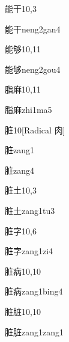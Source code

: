 \begin{entry}{能干}{10,3}
  \begin{phonetics}{能干}{neng2gan4}
  \end{phonetics}
\end{entry}

\begin{entry}{能够}{10,11}
  \begin{phonetics}{能够}{neng2gou4}
  \end{phonetics}
\end{entry}

\begin{entry}{脂麻}{10,11}
  \begin{phonetics}{脂麻}{zhi1ma5}
  \end{phonetics}
\end{entry}

\begin{entry}{脏}{10}[Radical 肉]
  \begin{phonetics}{脏}{zang1}
  \end{phonetics}
  \begin{phonetics}{脏}{zang4}
  \end{phonetics}
\end{entry}

\begin{entry}{脏土}{10,3}
  \begin{phonetics}{脏土}{zang1tu3}
  \end{phonetics}
\end{entry}

\begin{entry}{脏字}{10,6}
  \begin{phonetics}{脏字}{zang1zi4}
  \end{phonetics}
\end{entry}

\begin{entry}{脏病}{10,10}
  \begin{phonetics}{脏病}{zang1bing4}
  \end{phonetics}
\end{entry}

\begin{entry}{脏脏}{10,10}
  \begin{phonetics}{脏脏}{zang1zang1}
  \end{phonetics}
\end{entry}

